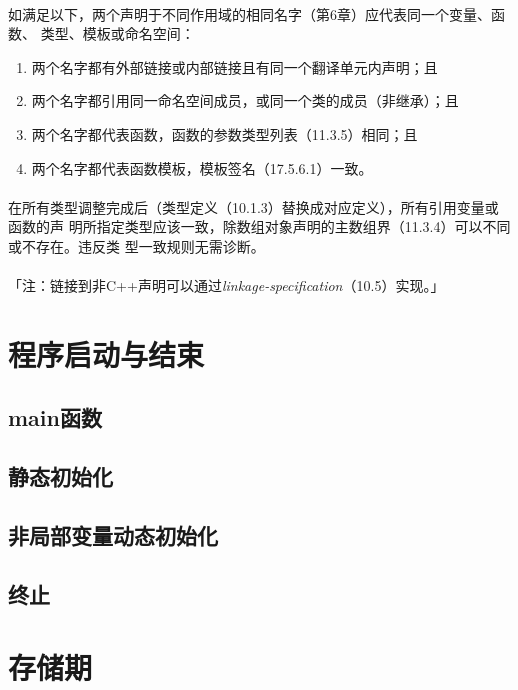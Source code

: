 \paragraph{}
如满足以下，两个声明于不同作用域的相同名字（第6章）应代表同一个变量、函数、
类型、模板或命名空间：
\begin{enumerate}
  \item{两个名字都有外部链接或内部链接且有同一个翻译单元内声明；且}
  \item{两个名字都引用同一命名空间成员，或同一个类的成员（非继承）；且}
  \item{两个名字都代表函数，函数的参数类型列表（11.3.5）相同；且}
  \item{两个名字都代表函数模板，模板签名（17.5.6.1）一致。}
\end{enumerate}

\paragraph{}
在所有类型调整完成后（类型定义（10.1.3）替换成对应定义），所有引用变量或函数的声
明所指定类型应该一致，除数组对象声明的主数组界（11.3.4）可以不同或不存在。违反类
型一致规则无需诊断。

\paragraph{}
「注：链接到非C++声明可以通过\textit{linkage-specification}（10.5）实现。」

\section{程序启动与结束}
\subsection{main函数}
\subsection{静态初始化}
\subsection{非局部变量动态初始化}
\subsection{终止}

\section{存储期}

